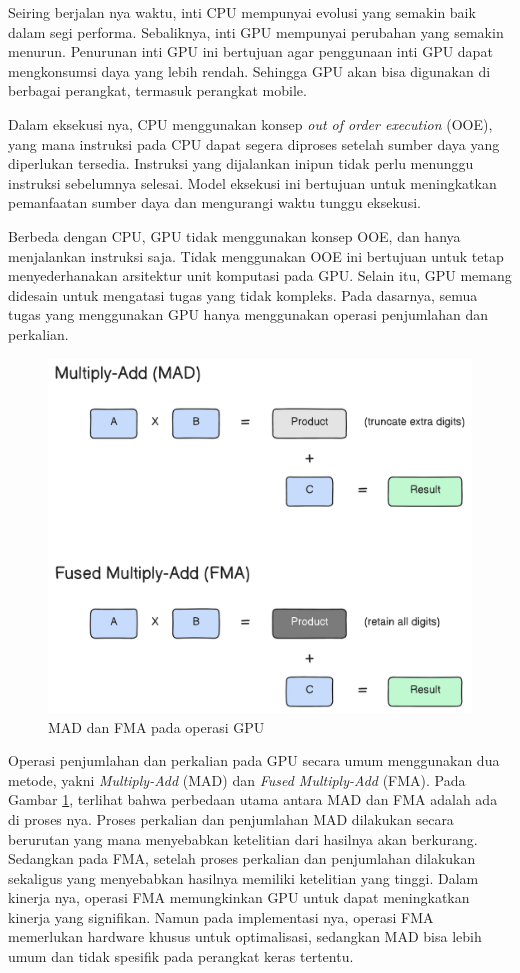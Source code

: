 Seiring berjalan nya waktu, inti CPU mempunyai evolusi yang semakin baik dalam
segi performa. Sebaliknya, inti GPU mempunyai perubahan yang semakin menurun.
Penurunan inti GPU ini bertujuan agar penggunaan inti GPU dapat mengkonsumsi
daya yang lebih rendah. Sehingga GPU akan bisa digunakan di berbagai perangkat,
termasuk perangkat mobile.

Dalam eksekusi nya, CPU menggunakan konsep \emph{out of order execution} (OOE),
yang mana instruksi pada CPU dapat segera diproses setelah sumber daya yang
diperlukan tersedia. Instruksi yang dijalankan inipun tidak perlu menunggu
instruksi sebelumnya selesai. Model eksekusi ini bertujuan untuk meningkatkan
pemanfaatan sumber daya dan mengurangi waktu tunggu eksekusi.

Berbeda dengan CPU, GPU tidak menggunakan konsep OOE, dan hanya menjalankan
instruksi saja. Tidak menggunakan OOE ini bertujuan untuk tetap menyederhanakan
arsitektur unit komputasi pada GPU. Selain itu, GPU memang didesain untuk
mengatasi tugas yang tidak kompleks. Pada dasarnya, semua tugas yang
menggunakan GPU hanya menggunakan operasi penjumlahan dan perkalian.

\begin{figure}[H]
  \centering
  \includegraphics[width=14cm]{images/mad-and-fma-2.png}
  \caption{MAD dan FMA pada operasi GPU}
  \label{gambar mad-and-fma}
\end{figure}

Operasi penjumlahan dan perkalian pada GPU secara umum menggunakan dua metode,
yakni \emph{Multiply-Add} (MAD) dan \emph{Fused Multiply-Add} (FMA). Pada
Gambar \ref{gambar mad-and-fma}, terlihat bahwa perbedaan utama antara MAD dan
FMA adalah ada di proses nya. Proses perkalian dan penjumlahan MAD dilakukan
secara berurutan yang mana menyebabkan ketelitian dari hasilnya akan berkurang.
Sedangkan pada FMA, setelah proses perkalian dan penjumlahan dilakukan
sekaligus yang menyebabkan hasilnya memiliki ketelitian yang tinggi. Dalam
kinerja nya, operasi FMA memungkinkan GPU untuk dapat meningkatkan kinerja yang
signifikan. Namun pada implementasi nya, operasi FMA memerlukan hardware khusus
untuk optimalisasi, sedangkan MAD bisa lebih umum dan tidak spesifik pada
perangkat keras tertentu.

